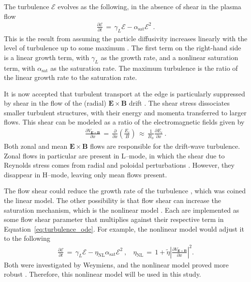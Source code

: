 The turbulence $\mathcal{E}$ evolves as the following, in the absence of shear in the plasma flow
\begin{align} %
	\frac{\partial\mathcal{E}}{\partial t} \,=\, \gamma_L\mathcal{E} - \alpha_\text{sat}\mathcal{E}^2~.
	\label{eq:turbulence_ode}
\end{align}
This is the result from assuming the particle diffusivity increases linearly with the level of turbulence up to some maximum \cite{diamond_dynamics_1995}.
The first term on the right-hand side is a linear growth term, with $\gamma_L$ as the growth rate, and a nonlinear saturation term, with $\alpha_\text{sat}$ as the saturation rate.
The maximum turbulence is the ratio of the linear growth rate to the saturation rate.

It is now accepted that turbulent transport at the edge is particularly suppressed by shear in the flow of the (radial) $\mathbf{E}\times\mathbf{B}$ drift \cite{terry_suppression_2000}.
The shear stress dissociates smaller turbulent structures, with their energy and momenta transferred to larger flows.
This shear can be modeled as a ratio of the electromagnetic fields given by \cite{staps_backstepping_2017}
\begin{align} %
	\frac{\partial V_{\mathbf{E}\times\mathbf{B}}}{\partial x} \,=\, \frac{\partial}{\partial x} \left(\frac{E_r}{B}\right) \,\approx\, \frac{1}{B_\phi} \frac{\partial E_r}{\partial x}~.
	\label{eq:velocity_shear}
\end{align}
Both zonal and mean $\mathbf{E}\times\mathbf{B}$ flows are responsible for the drift-wave turbulence.
Zonal flows in particular are present in L--mode, in which the shear due to Reynolds stress comes from radial and poloidal perturbations \cite{diamond_zonal_2005}.
However, they disappear in H--mode, leaving only mean flows present.

The flow shear could reduce the growth rate of the turbulence \cite{diamond_self-regulating_1994}, which was coined the linear model.
The other possibility is that flow shear can increase the saturation mechanism, which is the nonlinear model \cite{hahm_rotation_1994}.
Each are implemented as some flow shear parameter that multiplies against their respective term in Equation~\ref{eq:turbulence_ode}.
For example, the nonlinear model would adjust it to the following
\begin{align} %
	\frac{\partial\mathcal{E}}{\partial t} \,=\, \gamma_L\mathcal{E} - \eta_\text{NL}\alpha_\text{sat}\mathcal{E}^2~, ~~~~
	\eta_\text{NL} \,=\, 1 + \tilde{\eta} \left|\frac{\partial V_{\mathbf{E}\times\mathbf{B}}}{\partial x}\right|^2.
	\label{eq:nonlinear_turbulence_ode}
\end{align}
Both were investigated by Weymiens, and the nonlinear model proved more robust \cite{weymiens_bifurcation_2014}.
Therefore, this nonlinear model will be used in this study.

